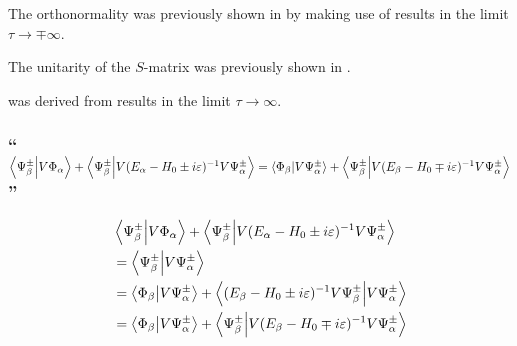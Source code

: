 The orthonormality was previously shown in  by making use of results in the limit $\tau\rightarrow \mp\infty$.

The unitarity of the $S$-matrix was previously shown in .

 was derived from results in the limit $\tau\rightarrow\infty$.


\subsubsection{\enquote{$\innerproduct{\Psi_\beta^\pm}{V\Phi_\alpha}+\innerproduct{\Psi_\beta^\pm}{V(E_\alpha-H_0\pm i \varepsilon)^{-1}V\Psi_\alpha^\pm}=\innerproduct{\Phi_\beta}{V\Psi_\alpha^\pm}+\innerproduct{\Psi_\beta^\pm}{V(E_\beta-H_0\mp i \varepsilon)^{-1}V\Psi_\alpha^\pm}$} }
\begin{align*}
	&\innerproduct{\Psi_\beta^\pm}{V\Phi_\alpha}+\innerproduct{\Psi_\beta^\pm}{V(E_\alpha-H_0\pm i \varepsilon)^{-1}V\Psi_\alpha^\pm}\\
	&=\innerproduct{\Psi_\beta^\pm}{V\Psi_\alpha^\pm}\\
	&=\innerproduct{\Phi_\beta}{V\Psi_\alpha^\pm}+\innerproduct{(E_\beta-H_0\pm i \varepsilon)^{-1}V\Psi_\beta^\pm}{V\Psi_\alpha^\pm}\\
	&=\innerproduct{\Phi_\beta}{V\Psi_\alpha^\pm}+\innerproduct{\Psi_\beta^\pm}{V(E_\beta-H_0\mp i \varepsilon)^{-1}V\Psi_\alpha^\pm}
\end{align*}


